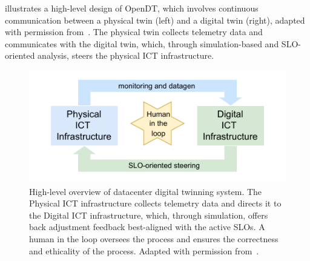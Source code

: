  illustrates a high-level design of OpenDT, which involves continuous communication between a physical twin (left) and a digital twin (right), adapted with permission from~\cite{Iosup2024DigitalTwins}. The physical twin collects telemetry data and communicates with the digital twin, which, through simulation-based and SLO-oriented analysis, steers the physical ICT infrastructure. 



\begin{figure}
    \centering
    \includegraphics[width=0.98\linewidth]{report/figures/high-level-overview-dt-pt.pdf}
    \vspace*{-0.2cm}
    \caption{High-level overview of datacenter digital twinning system. The Physical ICT infrastructure collects telemetry data and directs it to the Digital ICT infrastructure, which, through simulation, offers back adjustment feedback best-aligned with the active SLOs. A human in the loop oversees the process and ensures the correctness and ethicality of the process. Adapted with permission from~\cite{Iosup2024DigitalTwins}.}
    \label{fig:high-level-element}

    \vspace*{-0.7cm}
\end{figure}


